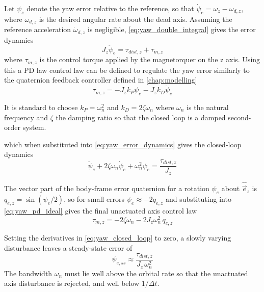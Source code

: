Let $\psi_e$ denote the yaw error relative to the reference, so that $\dot{\psi}_e = \omega_z - \omega_{d,z}$, where $\omega_{d,z}$ is the desired angular rate about the dead axis. Assuming the reference acceleration $\dot{\omega}_{d,z}$ is negligible, \autoref{eq:yaw_double_integral} gives the error dynamics
\begin{equation}
    J_z\ddot{\psi}_e = \tau_{dist,z} + \tau_{m,z}
    \label{eq:yaw_error_dynamics}
\end{equation}
where $\tau_{m,z}$ is the control torque applied by the magnetorquer on the z axis.
Using this a PD law control law can be defined to regulate the yaw error similarly to the quaternion feedback controller defined in \autoref{chap:modelling}
\begin{equation}
    \tau_{m,z} = - J_z k_P\psi_e - J_z k_D\dot{\psi}_e
    \label{eq:yaw_pd_ideal}
\end{equation}

It is standard to choose $k_P = \omega_n^2$ and $k_D = 2\zeta\omega_n$ where $\omega_n$ is the natural frequency and $\zeta$ the damping ratio so that the closed loop is a damped second-order system.


which when substituted into \autoref{eq:yaw_error_dynamics} gives the closed-loop dynamics
\begin{equation}
      \ddot{\psi}_e + 2\zeta\omega_n\dot{\psi}_e + \omega_n^2\psi_e = \frac{\tau_{dist,z}}{J_z}
    \label{eq:yaw_closed_loop}
\end{equation}

The vector part of the body-frame error quaternion for a rotation $\psi_e$ about $\hat{\vec{e}}_z$ is $q_{e,z} = \sin(\psi_e/2)$, so for small errors $\psi_e \approx -2q_{e,z}$ and substituting into \autoref{eq:yaw_pd_ideal} gives the final unactuated axis control law
\begin{equation}
    \tau_{m,z} = -2\zeta\omega_n - 2J_z\omega_n^2\,q_{e,z}
    \label{eq:dead_axis_pd}
\end{equation}

Setting the derivatives in \autoref{eq:yaw_closed_loop} to zero, a slowly varying disturbance leaves a steady-state error of
\begin{equation}
    \psi_{e,ss} \approx \frac{\tau_{dist,z}}{J_z\,\omega_n^2}
    \label{eq:yaw_ss_error}
\end{equation}
The bandwidth $\omega_n$ must lie well above the orbital rate so that the unactuated axis disturbance is rejected, and well below $1/\Delta t$. 

